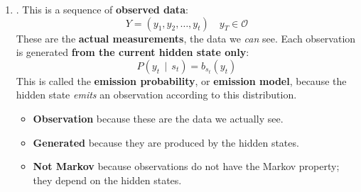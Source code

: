 \begin{enumerate}
    \item {}. This is a sequence of \textbf{observed data}:
    \begin{equation*}
        Y = \left(y_1, y_2, \ldots, y_t\right) \quad y_T \in \mathcal{O}
    \end{equation*}
    These are the \textbf{actual measurements}, the data we \emph{can} see. Each observation is generated \textbf{from the current hidden state only}:
    \begin{equation*}
        P\left(y_t \, \mid \, s_t\right) = b_{s_t}(y_t)
    \end{equation*}
    This is called the \textbf{emission probability}, or \textbf{emission model}, because the hidden state \emph{emits} an observation according to this distribution.
    \begin{itemize}
        \item \textbf{Observation} because these are the data we actually see.
        \item \textbf{Generated} because they are produced by the hidden states.
        \item \textbf{Not Markov} because observations do not have the Markov property; they depend on the hidden states.
    \end{itemize}


\end{enumerate}
